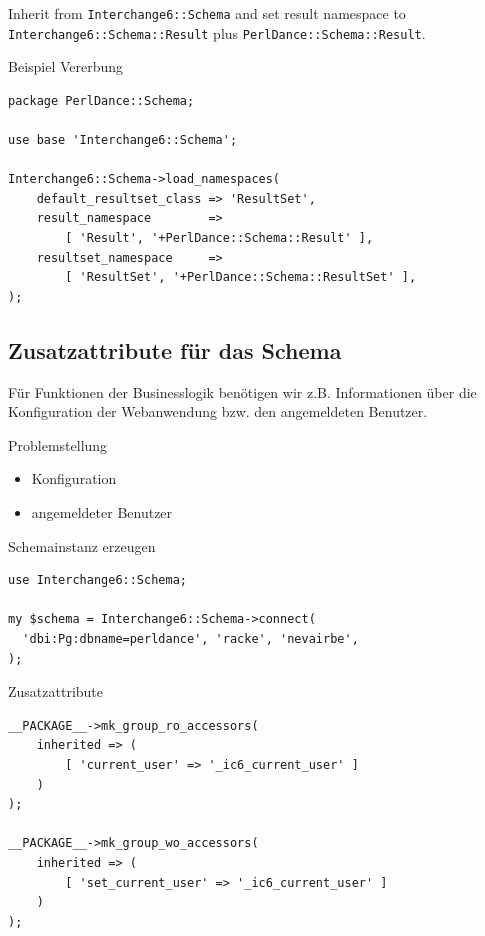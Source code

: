 Inherit from \verb|Interchange6::Schema| and set result namespace to 
\verb|Interchange6::Schema::Result| plus \verb|PerlDance::Schema::Result|.

\begin{frame}[fragile]{Beispiel Vererbung}
\begin{lstlisting}
package PerlDance::Schema;

use base 'Interchange6::Schema';

Interchange6::Schema->load_namespaces(
    default_resultset_class => 'ResultSet',
    result_namespace        =>
        [ 'Result', '+PerlDance::Schema::Result' ],
    resultset_namespace     =>
        [ 'ResultSet', '+PerlDance::Schema::ResultSet' ],
);
\end{lstlisting}
\end{frame}

\subsection{Zusatzattribute für das Schema}

Für Funktionen der Businesslogik benötigen wir z.B.
Informationen über die Konfiguration der Webanwendung
bzw. den angemeldeten Benutzer.

\begin{frame}{Problemstellung}
\begin{itemize}
\item Konfiguration
\item angemeldeter Benutzer
\end{itemize}
\end{frame}

\begin{frame}[fragile]{Schemainstanz erzeugen}
\begin{lstlisting}
use Interchange6::Schema;

my $schema = Interchange6::Schema->connect(
  'dbi:Pg:dbname=perldance', 'racke', 'nevairbe', 
);
\end{lstlisting}
\end{frame}

\begin{frame}[fragile]{Zusatzattribute}
\begin{lstlisting}
__PACKAGE__->mk_group_ro_accessors(
    inherited => (
        [ 'current_user' => '_ic6_current_user' ]
    )
);

__PACKAGE__->mk_group_wo_accessors(
    inherited => (
        [ 'set_current_user' => '_ic6_current_user' ]
    )
);
\end{lstlisting}
\end{frame}

